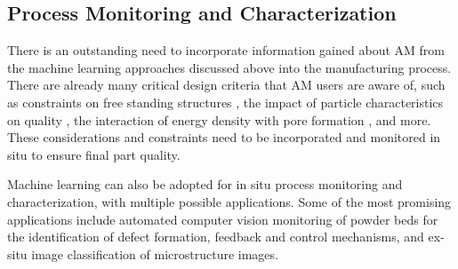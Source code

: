 \subsection{Process Monitoring and Characterization}
There is an outstanding need to incorporate information gained about AM from the machine learning approaches discussed above into the manufacturing process. There are already many critical design criteria that AM users are aware of, such as constraints on free standing structures \cite{Gaynor2016}, the impact of particle characteristics on quality \cite{Deng2018, Ziolkowski2014}, the interaction of energy density with pore formation \cite{King2014, Cherry2015}, and more. These considerations and constraints need to be incorporated and monitored in situ to ensure final part quality. 

Machine learning can also be adopted for in situ process monitoring and characterization, with multiple possible applications. Some of the most promising applications include automated computer vision monitoring of powder beds for the identification of defect formation, feedback and control mechanisms, and ex-situ image classification of microstructure images.



 


